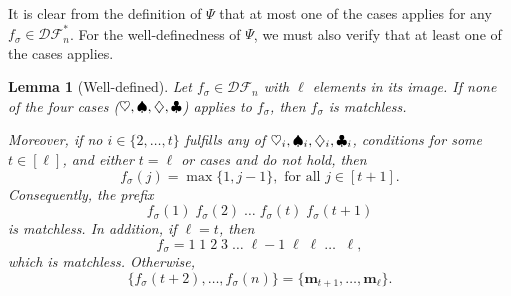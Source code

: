 \documentclass[reqno]{amsart}
\newtheorem{lemma}[theorem]{Lemma}
\theoremstyle{definition}
\newcommand{\DSEF}{\mathcal{DF}}%
\newcommand{\fretherD}{\Psi}
\newcommand{\img}{\mathbf{m}}
\begin{document}
It is clear from the definition of $\fretherD$ that at most one of the cases applies for any $f_\sigma\in\DSEF^*_n$. For the well-definedness of $\fretherD$, we must also verify that at least one of the cases applies.

\begin{lemma}[Well-defined]\label{lem:fretherDIsWellDefined}
Let $f_\sigma \in \DSEF_n$ with $\ell$ elements in its image.
If none of the four cases ($\caseOne,\caseTwo,\caseThree,\caseFour$)
applies to $f_\sigma$, then $f_\sigma$ is matchless.

Moreover, if no $i \in \{2,\dotsc,t\}$ fulfills any of $\caseOne_i,\caseTwo_i,\caseThree_i,\caseFour_i$,
conditions for some $t\in[\ell]$,
and either $t=\ell$ or cases \caseOne[t+1] and \caseTwo[t+1] do not hold, then 
\begin{equation}\label{eq:sefPartialset}
f_\sigma(j)=\max\{1,j-1\},\text{ for all }j\in[t+1].
\end{equation}
Consequently, the prefix
\begin{equation}\label{eq:sefPartial}
	f_\sigma(1)\; f_\sigma(2)\; \dotsc \; f_\sigma(t)  \; f_\sigma(t+1) 
\end{equation}
is matchless. 
In addition, if $\ell=t$, then 
\begin{equation}\label{eq:matchlessfsigma}
	f_\sigma = 1\; 1\;2\;3\; \dotsc \; \ell{-}1 \; \ell \; \ell \; \dotsc \; \; \ell,
\end{equation}
which is matchless. Otherwise, 
\begin{equation}\label{eq:leftover}
\{f_\sigma(t+2),\dotsc,f_\sigma(n)\}=\{\img_{t+1},\dotsc,\img_\ell\}.
\end{equation}
\end{lemma}
%
\end{document}
